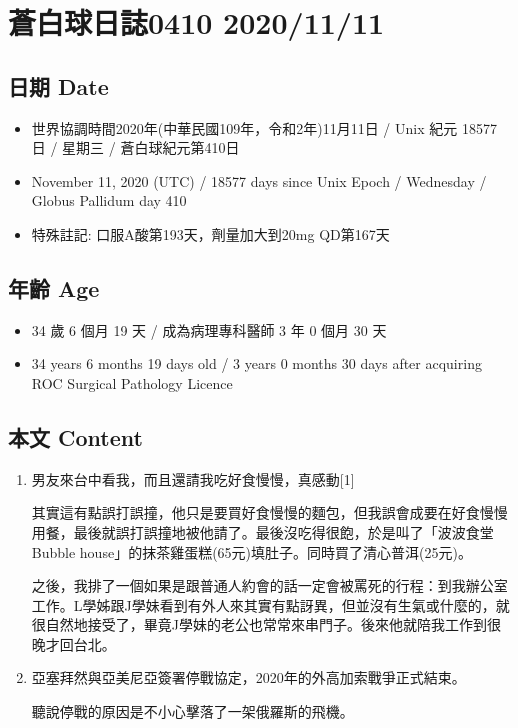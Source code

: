 \documentclass[
]{article}
\providecommand{\tightlist}{%
  \setlength{\itemsep}{0pt}\setlength{\parskip}{0pt}}
\begin{document}
\hypertarget{ux84bcux767dux7403ux65e5ux8a8c0410-20201111}{%
\section{蒼白球日誌0410
2020/11/11}\label{ux84bcux767dux7403ux65e5ux8a8c0410-20201111}}

\hypertarget{ux65e5ux671f-date-8}{%
\subsection{日期 Date}\label{ux65e5ux671f-date-8}}

\begin{itemize}
\tightlist
\item
  世界協調時間2020年(中華民國109年，令和2年)11月11日 / Unix 紀元 18577
  日 / 星期三 / 蒼白球紀元第410日
\item
  November 11, 2020 (UTC) / 18577 days since Unix Epoch / Wednesday /
  Globus Pallidum day 410
\item
  特殊註記: 口服A酸第193天，劑量加大到20mg QD第167天
\end{itemize}

\hypertarget{ux5e74ux9f61-age-8}{%
\subsection{年齡 Age}\label{ux5e74ux9f61-age-8}}

\begin{itemize}
\tightlist
\item
  34 歲 6 個月 19 天 / 成為病理專科醫師 3 年 0 個月 30 天
\item
  34 years 6 months 19 days old / 3 years 0 months 30 days after
  acquiring ROC Surgical Pathology Licence
\end{itemize}

\hypertarget{ux672cux6587-content-8}{%
\subsection{本文 Content}\label{ux672cux6587-content-8}}

\begin{enumerate}
\def\labelenumi{\arabic{enumi}.}
\item
  男友來台中看我，而且還請我吃好食慢慢，真感動{[}1{]}

  其實這有點誤打誤撞，他只是要買好食慢慢的麵包，但我誤會成要在好食慢慢用餐，最後就誤打誤撞地被他請了。最後沒吃得很飽，於是叫了「波波食堂Bubble
  house」的抹茶雞蛋糕(65元)填肚子。同時買了清心普洱(25元)。

  之後，我排了一個如果是跟普通人約會的話一定會被罵死的行程：到我辦公室工作。L學姊跟J學妹看到有外人來其實有點訝異，但並沒有生氣或什麼的，就很自然地接受了，畢竟J學妹的老公也常常來串門子。後來他就陪我工作到很晚才回台北。
\item
  亞塞拜然與亞美尼亞簽署停戰協定，2020年的外高加索戰爭正式結束。

  聽說停戰的原因是不小心擊落了一架俄羅斯的飛機。
\end{enumerate}
\end{document}
